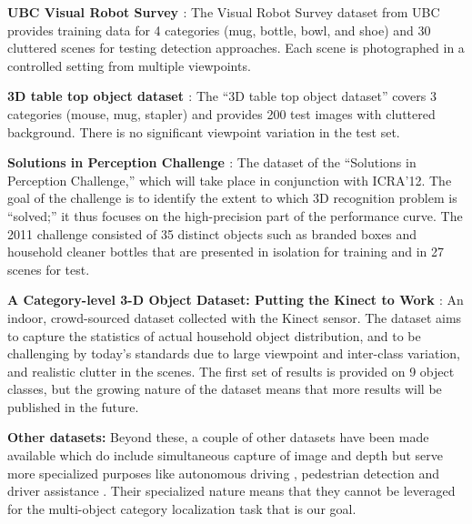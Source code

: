 {\bf UBC Visual Robot Survey \cite{Helmer2010}}:
The Visual Robot Survey dataset from UBC provides training data for 4 categories (mug, bottle, bowl, and shoe) and 30 cluttered scenes for testing detection approaches.
Each scene is photographed in a controlled setting from multiple viewpoints.

{\bf 3D table top object dataset \cite{Sun2010}}:
The ``3D table top object dataset'' covers 3 categories (mouse, mug, stapler) and provides 200 test images with cluttered background.
There is no significant viewpoint variation in the test set.

{\bf Solutions in Perception Challenge \cite{SIPC2011}}:
The dataset of the ``Solutions in Perception Challenge,'' which will take place in conjunction with ICRA'12.
The goal of the challenge is to identify the extent to which 3D recognition problem is ``solved;'' it thus focuses on the high-precision part of the performance curve.
The 2011 challenge consisted of 35 distinct objects such as branded boxes and household cleaner bottles that are presented in isolation for training and in 27 scenes for test.

{\bf A Category-level 3-D Object Dataset: Putting the Kinect to Work \cite{Janoch2011}}:
An indoor, crowd-sourced dataset collected with the Kinect sensor.
The dataset aims to capture the statistics of actual household object distribution, and to be challenging by today's standards due to large viewpoint and inter-class variation, and realistic clutter in the scenes.
The first set of results is provided on 9 object classes, but the growing nature of the dataset means that more results will be published in the future.

{\bf Other datasets:} Beyond these, a couple of other datasets have been made available which do include simultaneous capture of image and depth but serve more specialized purposes like autonomous driving \cite{ford_dataset}, pedestrian detection \cite{leibe10ijrr} and driver assistance \cite{walk10eccv}.
Their specialized nature means that they cannot be leveraged for the multi-object category localization task that is our goal.

